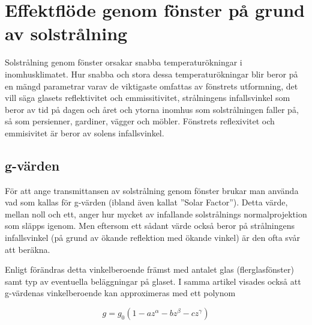 \section{Effektflöde genom fönster på grund av solstrålning}

Solstrålning genom fönster orsakar snabba temperaturökningar i inomhusklimatet. Hur snabba och stora dessa temperaturökningar blir beror på en mängd parametrar varav de viktigaste omfattas av fönstrets utformning, det vill säga glasets reflektivitet och emmissitivitet, strålningens infallsvinkel som beror av tid på dagen och året och ytorna inomhus som solstrålningen faller på, så som persienner, gardiner, vägger och möbler. Fönstrets reflexivitet och emmisivitet är beror av solens infallsvinkel.


\subsection{g-värden}\label{gvalue}

För att ange transmittansen av solstrålning genom fönster brukar man använda vad som kallas för g-värden (ibland även kallat ''Solar Factor''). Detta värde, mellan noll och ett, anger hur mycket av infallande solstrålnings normalprojektion som släpps igenom. Men eftersom ett sådant värde också beror på strålningens infallsvinkel (på grund av ökande reflektion med ökande vinkel) är den ofta svår att beräkna.

Enligt \cite{karlssonroos99} förändras detta vinkelberoende främst med antalet glas (flerglasfönster) samt typ av eventuella beläggningar på glaset. I samma artikel visades också att g-värdenas vinkelberoende kan approximeras med ett polynom

\begin{equation}\label{eq:radiationwindowstheory:gvalue}
g = g_0 \left( 1 - az^{\alpha} - bz^{\beta} - cz^{\gamma} \right)
\end{equation}

